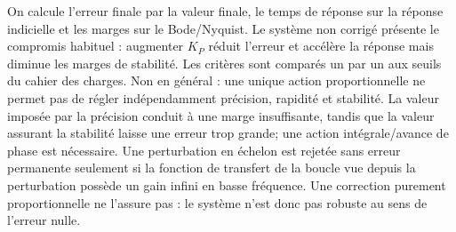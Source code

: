 \begin{corrigebox}
On calcule l'erreur finale par la valeur finale, le temps de réponse sur
            la réponse indicielle et les marges sur le Bode/Nyquist. Le système non corrigé
            présente le compromis habituel : augmenter $K_P$ réduit l'erreur et accélère
            la réponse mais diminue les marges de stabilité. Les critères sont comparés un
            par un aux seuils du cahier des charges.
Non en général : une unique action proportionnelle ne permet pas de régler
            indépendamment précision, rapidité et stabilité. La valeur imposée par la
            précision conduit à une marge insuffisante, tandis que la valeur assurant la
            stabilité laisse une erreur trop grande; une action intégrale/avance de phase
            est nécessaire.
Une perturbation en échelon est rejetée sans erreur permanente seulement
            si la fonction de transfert de la boucle vue depuis la perturbation possède un
            gain infini en basse fréquence. Une correction purement proportionnelle ne
            l'assure pas : le système n'est donc pas robuste au sens de l'erreur nulle.
\end{corrigebox}
